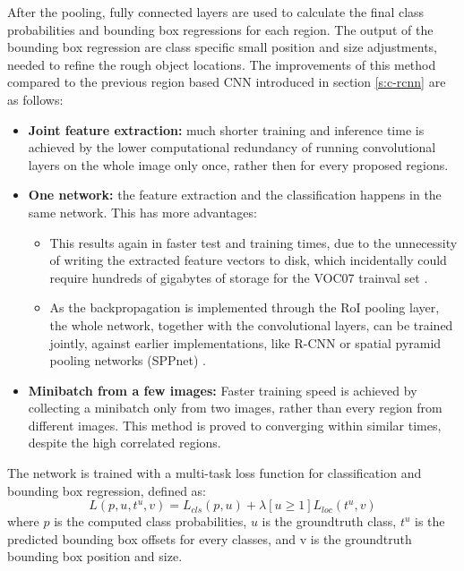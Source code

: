 After the pooling, fully connected layers are used to calculate the final class probabilities and bounding box regressions for each region. The output of the bounding box regression are class specific small position and size adjustments, needed to refine the rough object locations.
\smallbreak
The improvements of this method compared to the previous region based CNN introduced in section \ref{s:c-rcnn} are as follows:
\begin{itemize}
	\item\textbf{Joint feature extraction:} much shorter training and inference time is achieved by the lower computational redundancy of running convolutional layers on the whole image only once, rather then for every proposed regions.
	\item\textbf{One network:} the feature extraction and the classification happens in the same network. This has more advantages:
	\begin{itemize}
	        \item This results again in faster test and training times, due to the unnecessity of writing the extracted feature vectors to disk, which incidentally could require hundreds of gigabytes of storage \cite{Girshick:2016:RCN:2881668.2882239} for the VOC07 trainval set \cite{pascal-voc-2007}.
	        \item As the backpropagation is implemented through the RoI pooling layer, the whole network, together with the convolutional layers, can be trained jointly, against earlier implementations, like R-CNN \cite{DBLP:journals/corr/GirshickDDM13} or spatial pyramid pooling networks (SPPnet) \cite{DBLP:journals/corr/HeZR014}.
	\end{itemize}
	\item\textbf{Minibatch from a few images:} Faster training speed is achieved by collecting a minibatch only from two images, rather than every region from different images. This method is proved to converging within similar times, despite the high correlated regions.
\end{itemize}
The network is trained with a multi-task loss function for classification and bounding box regression, defined as:
\begin{equation}\label{eq:c-frcnn-loss}
	L(p, u, t^u, v) = L_{cls}(p, u) + \lambda [u \ge 1] L_{loc}(t^u, v)
\end{equation}
where $p$ is the computed class probabilities, $u$ is the groundtruth class, $t^u$ is the predicted bounding box offsets for every classes, and v is the groundtruth bounding box position and size.
